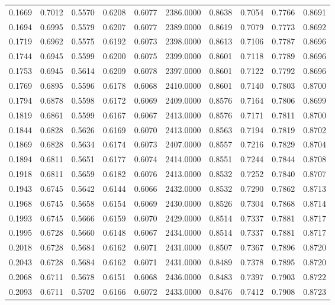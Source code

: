 \begin{tabular}{rrrrrrrrrr}
0.1669 & 0.7012 & 0.5570 & 0.6208 & 0.6077 & 2386.0000 & 0.8638 & 0.7054 & 0.7766 & 0.8691 \\
0.1694 & 0.6995 & 0.5579 & 0.6207 & 0.6077 & 2389.0000 & 0.8619 & 0.7079 & 0.7773 & 0.8692 \\
0.1719 & 0.6962 & 0.5575 & 0.6192 & 0.6073 & 2398.0000 & 0.8613 & 0.7106 & 0.7787 & 0.8696 \\
0.1744 & 0.6945 & 0.5599 & 0.6200 & 0.6075 & 2399.0000 & 0.8601 & 0.7118 & 0.7789 & 0.8696 \\
0.1753 & 0.6945 & 0.5614 & 0.6209 & 0.6078 & 2397.0000 & 0.8601 & 0.7122 & 0.7792 & 0.8696 \\
0.1769 & 0.6895 & 0.5596 & 0.6178 & 0.6068 & 2410.0000 & 0.8601 & 0.7140 & 0.7803 & 0.8700 \\
0.1794 & 0.6878 & 0.5598 & 0.6172 & 0.6069 & 2409.0000 & 0.8576 & 0.7164 & 0.7806 & 0.8699 \\
0.1819 & 0.6861 & 0.5599 & 0.6167 & 0.6067 & 2413.0000 & 0.8576 & 0.7171 & 0.7811 & 0.8700 \\
0.1844 & 0.6828 & 0.5626 & 0.6169 & 0.6070 & 2413.0000 & 0.8563 & 0.7194 & 0.7819 & 0.8702 \\
0.1869 & 0.6828 & 0.5634 & 0.6174 & 0.6073 & 2407.0000 & 0.8557 & 0.7216 & 0.7829 & 0.8704 \\
0.1894 & 0.6811 & 0.5651 & 0.6177 & 0.6074 & 2414.0000 & 0.8551 & 0.7244 & 0.7844 & 0.8708 \\
0.1918 & 0.6811 & 0.5659 & 0.6182 & 0.6076 & 2413.0000 & 0.8532 & 0.7252 & 0.7840 & 0.8707 \\
0.1943 & 0.6745 & 0.5642 & 0.6144 & 0.6066 & 2432.0000 & 0.8532 & 0.7290 & 0.7862 & 0.8713 \\
0.1968 & 0.6745 & 0.5658 & 0.6154 & 0.6069 & 2430.0000 & 0.8526 & 0.7304 & 0.7868 & 0.8714 \\
0.1993 & 0.6745 & 0.5666 & 0.6159 & 0.6070 & 2429.0000 & 0.8514 & 0.7337 & 0.7881 & 0.8717 \\
0.1995 & 0.6728 & 0.5660 & 0.6148 & 0.6067 & 2434.0000 & 0.8514 & 0.7337 & 0.7881 & 0.8717 \\
0.2018 & 0.6728 & 0.5684 & 0.6162 & 0.6071 & 2431.0000 & 0.8507 & 0.7367 & 0.7896 & 0.8720 \\
0.2043 & 0.6728 & 0.5684 & 0.6162 & 0.6071 & 2431.0000 & 0.8489 & 0.7378 & 0.7895 & 0.8720 \\
0.2068 & 0.6711 & 0.5678 & 0.6151 & 0.6068 & 2436.0000 & 0.8483 & 0.7397 & 0.7903 & 0.8722 \\
0.2093 & 0.6711 & 0.5702 & 0.6166 & 0.6072 & 2433.0000 & 0.8476 & 0.7412 & 0.7908 & 0.8723 \\

\end{tabular}
